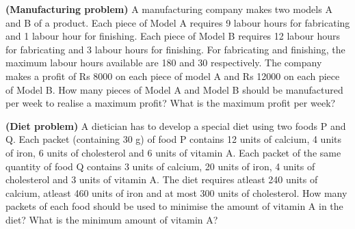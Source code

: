 \item  \textbf{(Manufacturing problem)} A manufacturing company makes two models
A and B of a product. Each piece of Model A requires 9 labour hours for fabricating
and 1 labour hour for finishing. Each piece of Model B requires 12 labour hours for
fabricating and 3 labour hours for finishing. For fabricating and finishing, the maximum
labour hours available are 180 and 30 respectively. The company makes a profit of
Rs 8000 on each piece of model A and Rs 12000 on each piece of Model B. How many
pieces of Model A and Model B should be manufactured per week to realise a maximum
profit? What is the maximum profit per week?\\
\solution

\item \textbf {(Diet problem)} A dietician has to develop a special diet using two foods
P and Q. Each packet (containing 30 g) of food P contains 12 units of calcium, 4 units
of iron, 6 units of cholesterol and 6 units of vitamin A. Each packet of the same quantity
of food Q contains 3 units of calcium, 20 units of iron, 4 units of cholesterol and 3 units
of vitamin A. The diet requires atleast 240 units of calcium, atleast 460 units of iron and
at most 300 units of cholesterol. How many packets of each food should be used to
minimise the amount of vitamin A in the diet? What is the minimum amount of vitamin A?\\
\\
\solution


%
